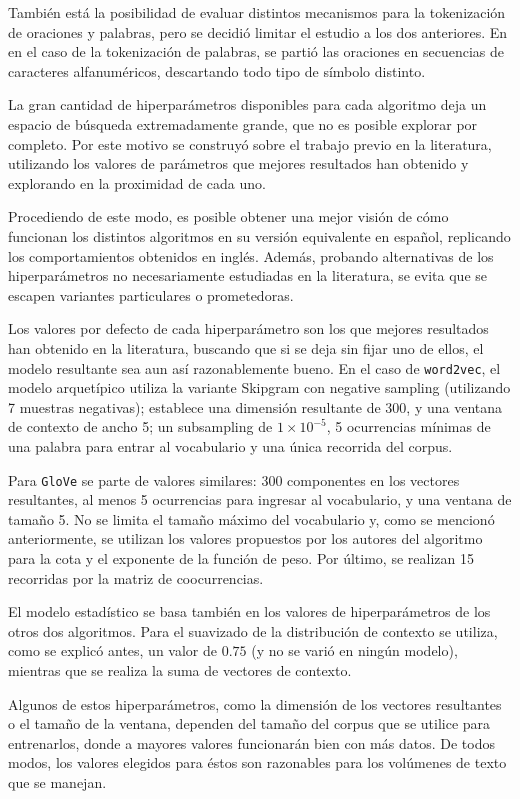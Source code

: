 También está la posibilidad de evaluar distintos mecanismos para la tokenización de oraciones y
palabras, pero se decidió limitar el estudio a los dos anteriores. En en el caso de la tokenización
de palabras, se partió las oraciones en secuencias de caracteres alfanuméricos, descartando todo
tipo de símbolo distinto.


La gran cantidad de hiperparámetros disponibles para cada algoritmo deja un espacio de búsqueda
extremadamente grande, que no es posible explorar por completo. Por este motivo se construyó sobre
el trabajo previo en la literatura, utilizando los valores de parámetros que mejores resultados han
obtenido y explorando en la proximidad de cada uno.

Procediendo de este modo, es posible obtener una mejor visión de cómo funcionan los distintos
algoritmos en su versión equivalente en español, replicando los comportamientos obtenidos en
inglés. Además, probando alternativas de los hiperparámetros no necesariamente estudiadas en la
literatura, se evita que se escapen variantes particulares o prometedoras.

Los valores por defecto de cada hiperparámetro son los que mejores resultados han obtenido en la
literatura, buscando que si se deja sin fijar uno de ellos, el modelo resultante sea aun así
razonablemente bueno. En el caso de \texttt{word2vec}, el modelo arquetípico utiliza la variante
Skipgram con negative sampling (utilizando 7 muestras negativas); establece una dimensión resultante
de 300, y una ventana de contexto de ancho 5; un subsampling de $1\times10^{-5}$, 5 ocurrencias
mínimas de una palabra para entrar al vocabulario y una única recorrida del corpus.

Para \texttt{GloVe} se parte de valores similares: 300 componentes en los vectores resultantes, al
menos 5 ocurrencias para ingresar al vocabulario, y una ventana de tamaño 5. No se limita el tamaño
máximo del vocabulario y, como se mencionó anteriormente, se utilizan los valores propuestos por los
autores del algoritmo para la cota y el exponente de la función de peso. Por último, se realizan 15
recorridas por la matriz de coocurrencias.

El modelo estadístico se basa también en los valores de hiperparámetros de los otros dos
algoritmos. Para el suavizado de la distribución de contexto se utiliza, como se explicó antes, un
valor de $0.75$ (y no se varió en ningún modelo), mientras que se realiza la suma de vectores de
contexto.

Algunos de estos hiperparámetros, como la dimensión de los vectores resultantes o el tamaño de la
ventana, dependen del tamaño del corpus que se utilice para entrenarlos, donde a mayores valores
funcionarán bien con más datos. De todos modos, los valores elegidos para éstos son razonables para
los volúmenes de texto que se manejan.

